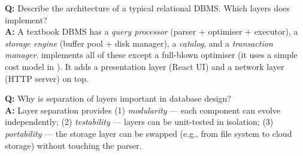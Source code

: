 \begin{interviewbox}
\textbf{Q:} Describe the architecture of a typical relational DBMS.  Which layers does \shiftdb{} implement?\\[4pt]
\textbf{A:} A textbook DBMS has a \emph{query processor} (parser + optimiser + executor), a \emph{storage engine} (buffer pool + disk manager), a \emph{catalog}, and a \emph{transaction manager}.  \shiftdb{} implements all of these except a full-blown optimiser (it uses a simple cost model in ).  It adds a presentation layer (React UI) and a network layer (HTTP server) on top.

\vspace{6pt}
\textbf{Q:} Why is separation of layers important in database design?\\[4pt]
\textbf{A:} Layer separation provides (1) \emph{modularity} --- each component can evolve independently; (2) \emph{testability} --- layers can be unit-tested in isolation; (3) \emph{portability} --- the storage layer can be swapped (e.g., from file system to cloud storage) without touching the parser.
\end{interviewbox}
